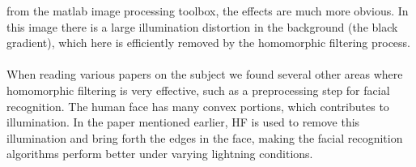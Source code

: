 \documentclass[a4paper]{article}
\begin{document}
		from the matlab image processing toolbox, the effects are much more obvious. 
		In this image there is a large illumination
		distortion in the background (the black gradient), which here is efficiently 
		removed by the homomorphic filtering process. \\
		\\
		When reading various papers on the
		subject we found several other areas where homomorphic filtering is very effective,
		such as a preprocessing step for facial recognition. The human face has many convex
		portions, which contributes to illumination. In the paper mentioned earlier, HF
		is used to remove this illumination and bring forth the edges in the face, making
		the facial recognition algorithms perform better under varying lightning conditions.
\end{document}

